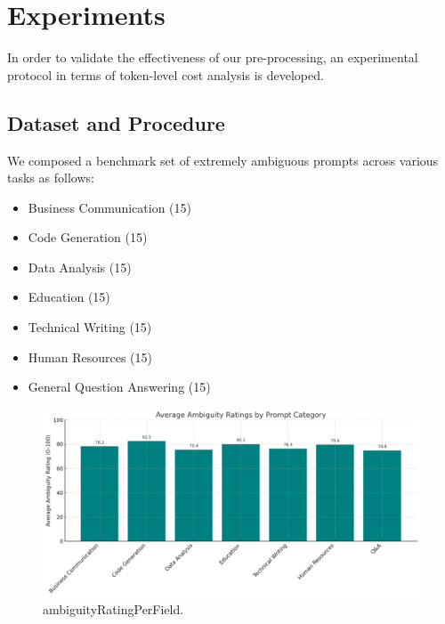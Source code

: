 \documentclass[11pt,a4paper]{article}
\begin{document}
\section{Experiments}
In order to validate the effectiveness of our pre-processing, an experimental protocol in terms of token-level cost analysis is developed.

\subsection{Dataset and Procedure}
We composed a benchmark set of extremely ambiguous prompts across various tasks as follows:
\begin{itemize}
    \item Business Communication (15)
    \item Code Generation (15)
    \item Data Analysis (15)
    \item Education (15)
    \item Technical Writing (15)
    \item Human Resources (15)
    \item General Question Answering (15)
\end{itemize}

\begin{figure}[!t]
\centering
\includegraphics[width=\columnwidth]{images/Figure3.jpeg}
\caption{ambiguityRatingPerField.}
\label{fig_ratingperfield}
\end{figure}
\end{document}
